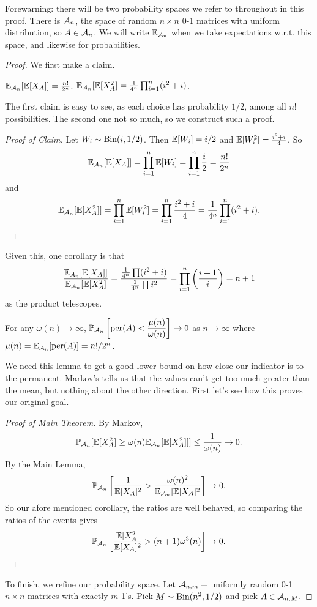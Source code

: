 \documentclass[11 pt]{scrartcl}
\newcommand{\per}{\text{per}}
\newcommand{\EEm}{\EE_{\Acal_n}}
\newcommand{\PPm}{\PP_{\Acal_n}}
\begin{document}
Forewarning: there will be two probability spaces we refer to throughout in this proof. There is $\mathcal A_n$, the space of random $n\times n$ 0-1 matrices with uniform distribution, so $A \in \mathcal A_n$. We will write $\mathbb E_{\mathcal A_n}$ when we take expectations w.r.t. this space, and likewise for probabilities. 

\begin{proof}
    We first make a claim. 
    \begin{claim}
    \alphanum
        \ii $\EEm[\EE[X_A]] =  \frac{n!}{2^n}$.
        \ii $\EEm[\EE[X_A^2] = \frac{1}{4^n} \prod_{i=1}^n (i^2+i)$.  
    \enumend
    \end{claim}
    The first claim is easy to see, as each choice has probability $1/2$, among all $n!$ possibilities. The second one not so much, so we construct such a proof. 
    \begin{proof}[Proof of Claim]
        Let $W_i \sim \text{Bin}(i, 1/2)$. Then $\mathbb E[W_i] = i/2$ and $\mathbb E[W_i^2] = \frac{i^2+i}{4}$. So 
        \[ \EEm[\EE[X_A]] = \prod_{i=1}^n \EE[W_i] = \prod_{i=1}^n \dfrac{i}{2} = \dfrac{n!}{2^n}\] 
        and 
        \[ \EEm[\EE[X_A^2]] = \prod_{i=1}^n \EE[W_i^2] = \prod_{i=1}^n \dfrac{i^2+i}{4} = \dfrac{1}{4^n} \prod_{i=1}^n (i^2+i).\] 
    \end{proof}
    Given this, one corollary is that 
    \[ \dfrac{\EEm[\EE[X_A]]}{\EEm[\EE[X_A^2]} = \dfrac{\frac{1}{4^n} \prod (i^2+i)}{\frac{1}{4^n} \prod i^2} = \prod_{i=1}^n \left(\dfrac{i+1}{i}\right) = n+1\] 
    as the product telescopes. 

    \begin{lemma}
        For any $\omega(n)\to \infty$, $\PPm\left[\per(A) < \dfrac{\mu(n)}{\omega(n)}\right]\to 0$ as $n\to \infty$ where $\mu(n) = \EEm[\per(A)] = n!/2^n$. 
    \end{lemma}
    We need this lemma to get a good lower bound on how close our indicator is to the permanent. Markov's tells us that the values can't get too much greater than the mean, but nothing about the other direction. First let's see how this proves our original goal. 
    \begin{proof}[Proof of Main Theorem]
        By Markov, 
        \[ \PPm[\EE[X_A^2] \geq \omega(n) \EEm[\EE[X_A^2]]] \leq \frac{1}{\omega(n)} \to 0.\]
        By the Main Lemma, 
        \[ \PPm\left[\dfrac{1}{\EE[X_A]^2} > \dfrac{\omega(n)^2}{\EEm[\EE[X_A]^2}  \right]\to 0.\] 
        So our afore mentioned corollary, the ratios are well behaved, so comparing the ratios of the events gives 
        \[ \PPm\left[\dfrac{\EE[X_A^2]}{\EE[X_A]^2} > (n+1)\omega^3(n)\right] \to 0.\] 
    \end{proof}
    To finish, we refine our probability space. Let $\mathcal A_{n,m} = $ uniformly random 0-1 $n\times n$ matrices with exactly $m$ 1's. Pick $M\sim \text{Bin}(n^2, 1/2)$ and pick $A \in \mathcal A_{n, M}$. 


\end{proof}
\end{document}
